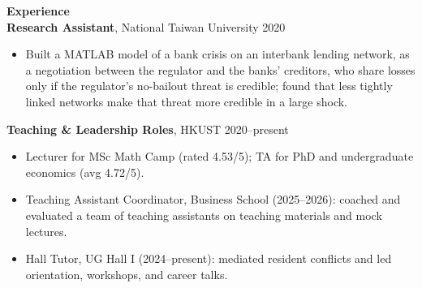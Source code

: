 \documentclass[11pt,letterpaper]{article}
\begin{document}
{\large \textbf{Experience}}\\[1pt]
\textbf{Research Assistant}, National Taiwan University \hfill 2020\\
\vspace{1pt}
\begin{itemize}
  \item Built a MATLAB model of a bank crisis on an interbank lending network, as a negotiation between the regulator and the banks' creditors, who share losses only if the regulator's no-bailout threat is credible; found that less tightly linked networks make that threat more credible in a large shock.
\end{itemize}
\textbf{Teaching \& Leadership Roles}, HKUST \hfill 2020--present\\
\vspace{1pt}
\begin{itemize}
  \item Lecturer for MSc Math Camp (rated 4.53/5); TA for PhD and undergraduate economics (avg 4.72/5).
  \item Teaching Assistant Coordinator, Business School (2025--2026): coached and evaluated a team of teaching assistants on teaching materials and mock lectures.
  \item Hall Tutor, UG Hall I (2024--present): mediated resident conflicts and led orientation, workshops, and career talks.
\end{itemize}

\vspace{1pt}
\end{document}
